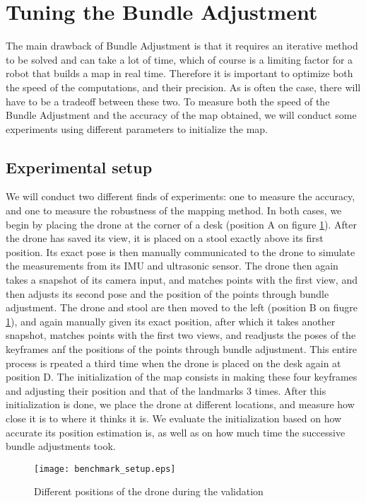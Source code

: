 \section{Tuning the Bundle Adjustment}
The main drawback of Bundle Adjustment is that it requires an iterative method to be solved and can take a lot of time, which of course is a limiting factor for a robot that builds a map in real time. Therefore it is important to optimize both the speed of the computations, and their precision. As is often the case, there will have to be a tradeoff between these two. To measure both the speed of the Bundle Adjustment and the accuracy of the map obtained, we will conduct some experiments using different parameters to initialize the map.
\subsection{Experimental setup}
We will conduct two different finds of experiments: one to measure the accuracy, and one to measure the robustness of the mapping method. In both cases, we begin by placing the drone at the corner of a desk (position A on figure \ref{fig:benchmarksetup}). After the drone has saved its view, it is placed on a stool exactly above its first position. Its exact pose is then manually communicated to the drone to simulate the measurements from its IMU and ultrasonic sensor. The drone then again takes a snapshot of its camera input, and matches points with the first view, and then adjusts its second pose and the position of the points through bundle adjustment. The drone and stool are then moved to the left (position B on fiugre \ref{fig:benchmarksetup}), and again manually given its exact position, after which it takes another snapshot, matches points with the first two views, and readjusts the poses of the keyframes anf the positions of the points through bundle adjustment. This entire process is rpeated a third time when the drone is placed on the desk again at position D. The initialization of the map consists in making these four keyframes and adjusting their position and that of the landmarks 3 times. After this initialization is done, we place the drone at different locations, and measure how close it is to where it thinks it is. We evaluate the initialization based on how accurate its position estimation is, as well as on how much time the successive bundle adjustments took.
\begin{figure}[H]
  \centering
  \texttt{[image: benchmark\_setup.eps]}
  \label{fig:benchmarksetup}
  \caption{Different positions of the drone during the validation}
\end{figure}




